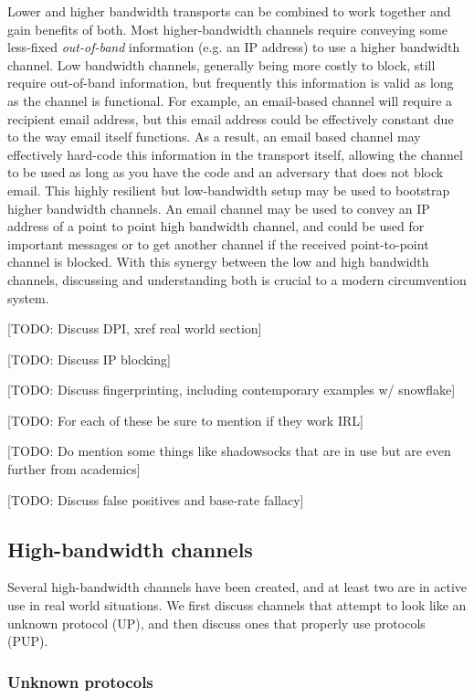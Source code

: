 \documentclass[12pt]{report}
\begin{document}
Lower and higher bandwidth transports can be combined to work together and gain benefits of both. Most higher-bandwidth channels require conveying some less-fixed \emph{out-of-band} information (e.g. an IP address) to use a higher bandwidth channel. Low bandwidth channels, generally being more costly to block, still require out-of-band information, but frequently this information is valid as long as the channel is functional. For example, an email-based channel will require a recipient email address, but this email address could be effectively constant due to the way email itself functions. As a result, an email based channel may effectively hard-code this information in the transport itself, allowing the channel to be used as long as you have the code and an adversary that does not block email. This highly resilient but low-bandwidth setup may be used to bootstrap higher bandwidth channels. An email channel may be used to convey an IP address of a point to point high bandwidth channel, and could be used for important messages or to get another channel if the received point-to-point channel is blocked. With this synergy between the low and high bandwidth channels, discussing and understanding both is crucial to a modern circumvention system.

[TODO: Discuss DPI, xref real world section]

[TODO: Discuss IP blocking]

[TODO: Discuss fingerprinting, including contemporary examples w/ snowflake]

[TODO: For each of these be sure to mention if they work IRL]

[TODO: Do mention some things like shadowsocks that are in use but are even further from academics]

[TODO: Discuss false positives and base-rate fallacy]

\subsection{High-bandwidth channels}

Several high-bandwidth channels have been created, and at least two are in active use in real world situations. We first discuss channels that attempt to look like an unknown protocol (UP), and then discuss ones that properly use protocols (PUP).

\subsubsection{Unknown protocols}
\end{document}
